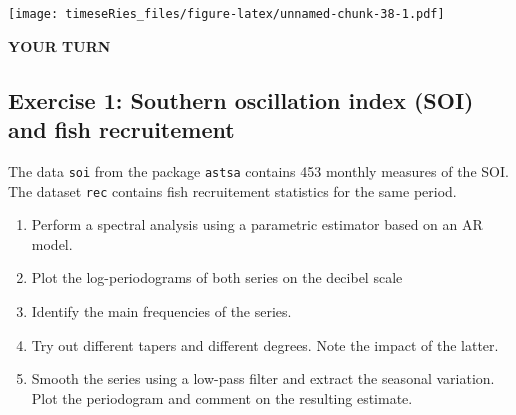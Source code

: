 \documentclass[]{book}
\newenvironment{Shaded}{\begin{snugshade}}{\end{snugshade}}
\newcommand{\KeywordTok}[1]{\textcolor[rgb]{0.13,0.29,0.53}{\textbf{#1}}}
\newcommand{\DataTypeTok}[1]{\textcolor[rgb]{0.13,0.29,0.53}{#1}}
\newcommand{\DecValTok}[1]{\textcolor[rgb]{0.00,0.00,0.81}{#1}}
\newcommand{\FloatTok}[1]{\textcolor[rgb]{0.00,0.00,0.81}{#1}}
\newcommand{\CharTok}[1]{\textcolor[rgb]{0.31,0.60,0.02}{#1}}
\newcommand{\StringTok}[1]{\textcolor[rgb]{0.31,0.60,0.02}{#1}}
\newcommand{\CommentTok}[1]{\textcolor[rgb]{0.56,0.35,0.01}{\textit{#1}}}
\newcommand{\OperatorTok}[1]{\textcolor[rgb]{0.81,0.36,0.00}{\textbf{#1}}}
\newcommand{\NormalTok}[1]{#1}
\providecommand{\tightlist}{%
  \setlength{\itemsep}{0pt}\setlength{\parskip}{0pt}}
\begin{document}
\begin{Shaded}
\end{Shaded}

\texttt{[image: timeseRies\_files/figure-latex/unnamed-chunk-38-1.pdf]}

\textbf{YOUR TURN}

\subsection{Exercise 1: Southern oscillation index (SOI) and fish
recruitement}\label{exercise-1-southern-oscillation-index-soi-and-fish-recruitement}

The data \texttt{soi} from the package \texttt{astsa} contains 453
monthly measures of the SOI. The dataset \texttt{rec} contains fish
recruitement statistics for the same period.

\begin{enumerate}
\def\labelenumi{\arabic{enumi}.}
\tightlist
\item
  Perform a spectral analysis using a parametric estimator based on an
  AR model.
\item
  Plot the log-periodograms of both series on the decibel scale
\item
  Identify the main frequencies of the series.
\item
  Try out different tapers and different degrees. Note the impact of the
  latter.
\item
  Smooth the series using a low-pass filter and extract the seasonal
  variation. Plot the periodogram and comment on the resulting estimate.
\end{enumerate}
\end{document}
